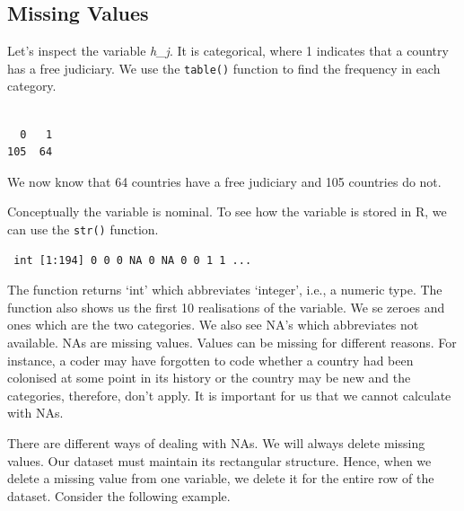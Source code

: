 \documentclass[]{book}
\newenvironment{Shaded}{\begin{snugshade}}{\end{snugshade}}
\newcommand{\KeywordTok}[1]{\textcolor[rgb]{0.13,0.29,0.53}{\textbf{#1}}}
\newcommand{\OperatorTok}[1]{\textcolor[rgb]{0.81,0.36,0.00}{\textbf{#1}}}
\newcommand{\NormalTok}[1]{#1}
\theoremstyle{definition}
\theoremstyle{definition}
\theoremstyle{definition}
\theoremstyle{remark}
\begin{document}
\subsection{Missing Values}\label{missing-values}

Let's inspect the variable \emph{h\_j}. It is categorical, where 1
indicates that a country has a free judiciary. We use the
\texttt{table()} function to find the frequency in each category.

\begin{Shaded}
\end{Shaded}

\begin{verbatim}

  0   1 
105  64 
\end{verbatim}

We now know that 64 countries have a free judiciary and 105 countries do
not.

Conceptually the variable is nominal. To see how the variable is stored
in R, we can use the \texttt{str()} function.

\begin{Shaded}
\end{Shaded}

\begin{verbatim}
 int [1:194] 0 0 0 NA 0 NA 0 0 1 1 ...
\end{verbatim}

The function returns `int' which abbreviates `integer', i.e., a numeric
type. The function also shows us the first 10 realisations of the
variable. We se zeroes and ones which are the two categories. We also
see NA's which abbreviates not available. NAs are missing values. Values
can be missing for different reasons. For instance, a coder may have
forgotten to code whether a country had been colonised at some point in
its history or the country may be new and the categories, therefore,
don't apply. It is important for us that we cannot calculate with NAs.

There are different ways of dealing with NAs. We will always delete
missing values. Our dataset must maintain its rectangular structure.
Hence, when we delete a missing value from one variable, we delete it
for the entire row of the dataset. Consider the following example.
\end{document}
